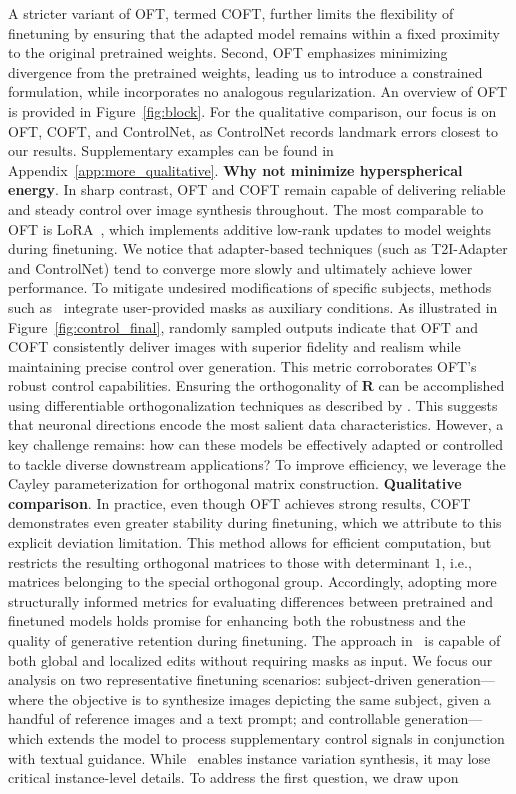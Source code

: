 {\begin{itemize}[leftmargin=*,nosep]
A stricter variant of OFT, termed COFT, further limits the flexibility of finetuning by ensuring that the adapted model remains within a fixed proximity to the original pretrained weights. Second, OFT emphasizes minimizing divergence from the pretrained weights, leading us to introduce a constrained formulation, while \cite{liu2021orthogonal} incorporates no analogous regularization. An overview of OFT is provided in Figure~\ref{fig:block}. For the qualitative comparison, our focus is on OFT, COFT, and ControlNet, as ControlNet records landmark errors closest to our results. Supplementary examples can be found in Appendix~\ref{app:more_qualitative}. \textbf{Why not minimize hyperspherical energy}. In sharp contrast, OFT and COFT remain capable of delivering reliable and steady control over image synthesis throughout. The most comparable to OFT is LoRA~\cite{hulora2022}, which implements additive low-rank updates to model weights during finetuning. We notice that adapter-based techniques (such as T2I-Adapter and ControlNet) tend to converge more slowly and ultimately achieve lower performance. To mitigate undesired modifications of specific subjects, methods such as~\cite{avrahami2022blended,nichol2022glide} integrate user-provided masks as auxiliary conditions. As illustrated in Figure~\ref{fig:control_final}, randomly sampled outputs indicate that OFT and COFT consistently deliver images with superior fidelity and realism while maintaining precise control over generation. This metric corroborates OFT's robust control capabilities. Ensuring the orthogonality of $\bm{R}$ can be accomplished using differentiable orthogonalization techniques as described by \cite{liu2021orthogonal,lezcano2019cheap}. This suggests that neuronal directions encode the most salient data characteristics. However, a key challenge remains: how can these models be effectively adapted or controlled to tackle diverse downstream applications? To improve efficiency, we leverage the Cayley parameterization for orthogonal matrix construction. \textbf{Qualitative comparison}. In practice, even though OFT achieves strong results, COFT demonstrates even greater stability during finetuning, which we attribute to this explicit deviation limitation. This method allows for efficient computation, but restricts the resulting orthogonal matrices to those with determinant $1$, i.e., matrices belonging to the special orthogonal group. Accordingly, adopting more structurally informed metrics for evaluating differences between pretrained and finetuned models holds promise for enhancing both the robustness and the quality of generative retention during finetuning. The approach in~\cite{hertz2022prompt} is capable of both global and localized edits without requiring masks as input. We focus our analysis on two representative finetuning scenarios: subject-driven generation—where the objective is to synthesize images depicting the same subject, given a handful of reference images and a text prompt; and controllable generation—which extends the model to process supplementary control signals in conjunction with textual guidance. While~\cite{casanova2021instance} enables instance variation synthesis, it may lose critical instance-level details. To address the first question, we draw upon 
\end{itemize}}
